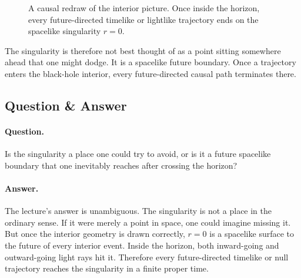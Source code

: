 \begin{figure}[htbp]
\centering
{}
\caption{A causal redraw of the interior picture. Once inside the horizon, every future-directed timelike or lightlike trajectory ends on the spacelike singularity \(r=0\).}
\end{figure}

The singularity is therefore not best thought of as a point sitting somewhere ahead that one might dodge. It is a spacelike future boundary. Once a trajectory enters the black-hole interior, every future-directed causal path terminates there.

\subsection{Question \& Answer}

\paragraph{Question.} Is the singularity a place one could try to avoid, or is it a future spacelike boundary that one inevitably reaches after crossing the horizon?

\paragraph{Answer.} The lecture's answer is unambiguous. The singularity is not a place in the ordinary sense. If it were merely a point in space, one could imagine missing it. But once the interior geometry is drawn correctly, \(r=0\) is a spacelike surface to the future of every interior event. Inside the horizon, both inward-going and outward-going light rays hit it. Therefore every future-directed timelike or null trajectory reaches the singularity in a finite proper time.

